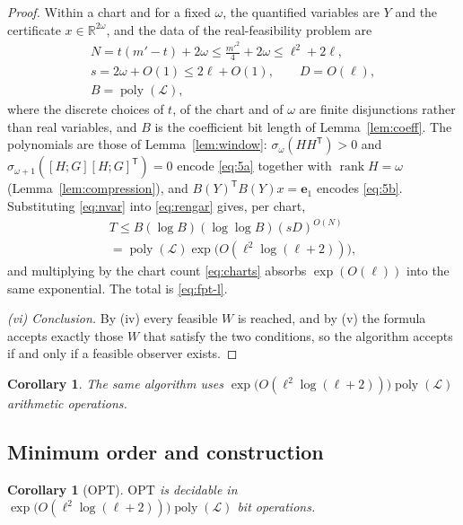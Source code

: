 \documentclass[journal]{IEEEtran}
\theoremstyle{plainn}
\newtheorem{cor}[thm]{Corollary}
\theoremstyle{remark}
\begin{document}
\begin{proof}
Within a chart and for a fixed $\omega$, the quantified variables are $Y$ and the certificate
$x\in\mathbb R^{2\omega}$, and the data of the real-feasibility problem are
\begin{equation}\label{eq:nvar}
\begin{gathered}
N=t(m'-t)+2\omega\le\tfrac{m'^2}{4}+2\omega\le\ell^2+2\ell,\\
s=2\omega+O(1)\le2\ell+O(1),\qquad D=O(\ell),\\
B=\operatorname{poly}(\mathcal L),
\end{gathered}
\end{equation}
where the discrete choices of $t$, of the chart and of $\omega$ are finite disjunctions rather
than real variables, and $B$ is the coefficient bit length of Lemma~\ref{lem:coeff}. The
polynomials are those of Lemma~\ref{lem:window}: $\sigma_\omega(HH^{\mathsf T})>0$ and
$\sigma_{\omega+1}([H;G][H;G]^{\mathsf T})=0$ encode \eqref{eq:5a} together with
$\operatorname{rank}H=\omega$ (Lemma~\ref{lem:compression}), and $B(Y)^{\mathsf T}B(Y)x=\mathbf
e_1$ encodes \eqref{eq:5b}. Substituting \eqref{eq:nvar} into \eqref{eq:rengar} gives, per
chart,
\begin{equation*}
\begin{gathered}
T\le B(\log B)(\log\log B)(sD)^{O(N)}\\
=\operatorname{poly}(\mathcal L)\exp\bigl(O(\ell^2\log(\ell+2))\bigr),
\end{gathered}
\end{equation*}
and multiplying by the chart count \eqref{eq:charts} absorbs $\exp(O(\ell))$ into the same
exponential. The total is \eqref{eq:fpt-l}.

\emph{(vi) Conclusion.} By (iv) every feasible $W$ is reached, and by (v) the formula accepts exactly
those $W$ that satisfy the two conditions, so the algorithm accepts if and only if a feasible observer
exists.
\end{proof}

\begin{cor}\label{cor:arith}
The same algorithm uses $\exp\bigl(O(\ell^2\log(\ell+2))\bigr)\operatorname{poly}(\mathcal L)$
arithmetic operations.
\end{cor}

\subsection{Minimum order and construction}\label{sec:optfind}

\begin{cor}[$\mathrm{OPT}$]\label{cor:opt}
$\mathrm{OPT}$ is decidable in $\exp\bigl(O(\ell^2\log(\ell+2))\bigr)\operatorname{poly}(\mathcal L)$
bit operations.
\end{cor}
\end{document}
